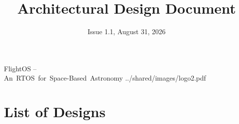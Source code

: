 

\title{Architectural Design Document}
\def \documentid {FLIGHTOS-UVIE-ADD-001}
\date{Issue 1.1, August 31, 2026}

\newcommand\affil[1]{\textsuperscript#1}

\def\preparedby {Armin Luntzer\affil{1}}
\def\checkedby {Roland Ottensamer\affil{1}}
\def\approvedby {Franz Kerschbaum\affil{1}}
\def\authorisedby{-}

\def\affiliations{
	\affil{1} Department of Astrophysics, University of Vienna
}






\usepackage{vhistory}

\usepackage[
	backend=biber,
	defernumbers,
	natbib=true,
	style=numeric, %
	sorting=none,
]{biblatex}



%




\rereadauxdesignlabels





\setmainfont{MyriadPro-SemiCondensed}
\uvietitlepage%
{FlightOS --\\\mbox{An RTOS for Space-Based Astronomy}}%
{\doctitle}%
{../shared/images/logo2.pdf}{}
\setmainfont{MyriadPro}

\approvalpage

\tableofcontents
\newpage


\chapter*{List of Designs}
\the\designlist


\begin{versionhistory}
\end{versionhistory}


